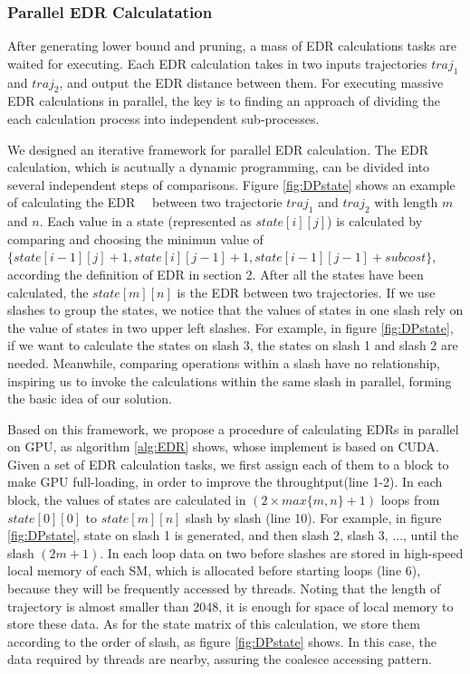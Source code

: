 \documentclass[conference]{IEEEtran}
\begin{document}
\subsubsection{Parallel EDR Calculatation}
After generating lower bound and pruning, a mass of EDR calculations tasks are waited for executing. Each EDR calculation takes in two inputs trajectories $traj_1$ and $traj_2$, and output the EDR distance between them. For executing massive EDR calculations in parallel, the key is to finding an approach of dividing the each calculation process into independent sub-processes.  

We designed an iterative framework for parallel EDR calculation. The EDR calculation, which is acutually a dynamic programming, can be divided into several independent steps of comparisons. Figure \ref{fig:DPstate} shows an example of calculating the EDR 　between two trajectorie $traj_1$ and $traj_2$ with length $m$ and $n$. Each value in a state (represented as $state[i][j]$) is calculated by comparing and choosing the minimun value of $\{state[i-1][j]+1,state[i][j-1]+1,state[i-1][j-1]+subcost\}$, according the definition of EDR in section 2. After all the states have been calculated, the $state[m][n]$ is the EDR between two trajectories. If we use slashes to group the states, we notice that the values of states in one slash rely on the value of states in two upper left slashes. For example, in figure \ref{fig:DPstate}, if we want to calculate the states on slash 3, the states on slash 1 and slash 2 are needed. Meanwhile, comparing operations within a slash have no relationship, inspiring us to invoke the calculations within the same slash in parallel, forming the basic idea of our solution.

Based on this framework, we propose a procedure of calculating EDRs in parallel on GPU, as algorithm \ref{alg:EDR} shows, whose implement is based on CUDA. Given a set of EDR calculation tasks, we first assign each of them to a block to make GPU full-loading, in order to improve the throughtput(line 1-2). In each block, the values of states are calculated in $(2\times max\{m,n\}+1)$ loops from $state[0][0]$ to $state[m][n]$ slash by slash (line 10). For example, in figure \ref{fig:DPstate}, state on slash 1 is generated, and then slash 2, slash 3, ..., until the slash $(2m+1)$. In each loop data on two before slashes are stored in high-speed local memory of each SM, which is allocated before starting loops (line 6), because they will be frequently accessed by threads. Noting that the length of trajectory is almost smaller than 2048, it is enough for space of local memory to store these data. As for the state matrix of this calculation, we store them according to the order of slash, as figure \ref{fig:DPstate} shows. In this case, the data required by threads are nearby, assuring the coalesce accessing pattern.
\end{document}
